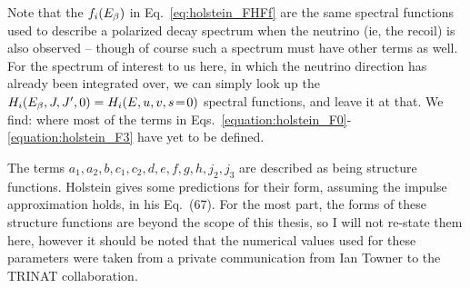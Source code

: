 Note that the $f_i(E_{\beta})$ in Eq.~\ref{eq:holstein_FHFf} are the same spectral functions used to describe a polarized decay spectrum when the neutrino (ie, the recoil) is also observed -- though of course such a spectrum must have other terms as well.  For the spectrum of interest to us here, in which the neutrino direction has already been integrated over, we can simply look up the $H_i(E_{\beta}, J, J^\prime, 0) = H_i(E, u, v, s\!=\!0)$ spectral functions, and leave it at that.  We find:
\unskip
\unskip
\unskip
\unskip
where most of the terms in Eqs.~\ref{equation:holstein_F0}-\ref{equation:holstein_F3} have yet to be defined.

The terms $a_1, a_2, b, c_1, c_2, d, e, f, g, h, j_2, j_3$ are described as being structure functions.  Holstein gives some predictions for their form, assuming the impulse approximation holds, in his Eq.~(67).
For the most part, the forms of these structure functions are beyond the scope of this thesis, so I will not re-state them here, however
it should be noted that the numerical values used for these parameters were taken from a private communication from Ian Towner to the TRINAT collaboration\cite{itownerCalcs}.

